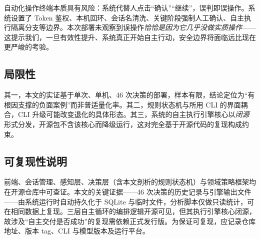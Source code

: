 自动化操作终端本质具有风险：系统代替人点击“确认”“继续”，误判即误操作。系统设置了 Token 鉴权、本机回环、会话名清洗、关键阶段强制人工确认、自主执行隔离分支等边界。本次部署未观察到误操作\emph{恰恰是因为它几乎没做实质操作}——这提示我们，一旦有效性提升、系统真正开始自主行动，安全边界将面临远比现在更严峻的考验。

\subsection{局限性}

其一，本文的实证基于单次、单机、46 次决策的部署，样本有限，结论定位为“有根因支撑的负面案例”而非普适量化率。其二，规则状态机与所用 CLI 的界面耦合，CLI 升级可能改变退化的具体形态。其三，系统的自主执行引擎核心以\emph{闭源}形式分发，开源包不含该核心而降级运行，这对完全基于开源代码的复现构成约束。

\subsection{可复现性说明}

前端、会话管理、感知层、决策层（含本文剖析的规则状态机）与领域策略框架均在开源仓库中可查证。本文的关键证据——46 次决策的历史记录与引擎输出文件——由系统运行时自动持久化于 SQLite 与临时文件，分析脚本仅做只读统计，可在相同数据上复现。三层自主循环的编排逻辑开源可见，但其执行引擎核心闭源，故涉及“自主交付是否成功”的复现需依赖正式发行版。为保证可复现，应记录仓库地址、版本 tag、CLI 与模型版本及运行平台。
